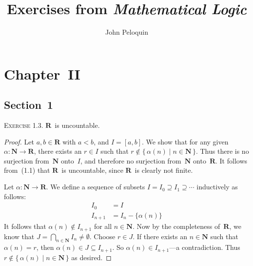 \documentclass[letterpaper]{article}
\title{Exercises from \emph{Mathematical Logic}}
\author{John Peloquin}
\date{}
\newcommand{\N}{\mathbf{N}}
\newcommand{\R}{\mathbf{R}}
\theoremstyle{remark}
\begin{document}
\maketitle
\section*{Chapter~II}

\subsection*{Section~1}
\noindent\textsc{Exercise 1.3.}
$\R$~is uncountable.
\begin{proof}
Let $a,b\in\R$ with $a<b$, and $I=[a,b]$. We show that for any given $\alpha:\N\to\R$, there exists an $r\in I$ such that $r\not\in\{\,\alpha(n)\mid n\in\N\,\}$. Thus there is no surjection from~$\N$ onto~$I$, and therefore no surjection from~$\N$ onto~$\R$. It follows from~(1.1) that $\R$~is uncountable, since $\R$~is clearly not finite.

Let $\alpha:\N\to\R$. We define a sequence of subsets $I=I_0\supseteq I_1\supseteq\cdots$ inductively as follows:
\begin{align*}
I_0&=I\\
I_{n+1}&=I_n-\{\alpha(n)\}
\end{align*}
It follows that $\alpha(n)\not\in I_{n+1}$ for all $n\in\N$. Now by the completeness of~$\R$, we know that $J=\bigcap_{n\in\N}I_n\ne\emptyset$. Choose $r\in J$. If there exists an $n\in\N$ such that $\alpha(n)=r$, then $\alpha(n)\in J\subseteq I_{n+1}$. So $\alpha(n)\in I_{n+1}$---a contradiction. Thus $r\not\in\{\,\alpha(n)\mid n\in\N\,\}$ as desired.
\end{proof}
\end{document}

